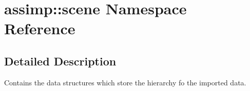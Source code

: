 \hypertarget{namespaceassimp_1_1scene}{\section{assimp\+:\+:scene Namespace Reference}
\label{namespaceassimp_1_1scene}
}


\subsection{Detailed Description}
Contains the data structures which store the hierarchy fo the imported data. 